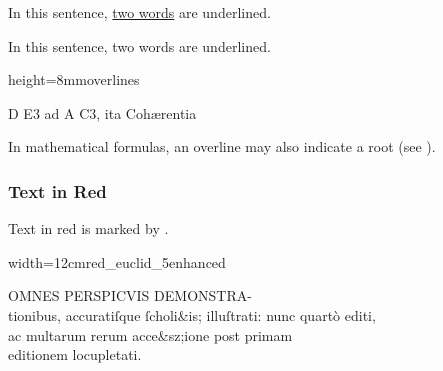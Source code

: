 
\vspace{3mm}
\begin{example}[ 1: \, underlines]

\vspace{-4mm}
In this sentence, \underline{two words} are underlined.

\vspace{-3mm}
\begin{typeLatin}
In this sentence, two words are underlined.
\end{typeLatin}
\end{example}

\begin{sampleImageSmall}[ 2: \, overlines]{height=8mm}{overlines}

\begin{typeLatin}
D E3 ad A C\lwr{}3, ita Cohærentia
\end{typeLatin}
\end{sampleImageSmall}

\begin{crossref}
In mathematical formulas, an overline may also indicate a root (see ).
\end{crossref}


\subsubsection{Text in Red}
\label{section text in red}

\begin{mainruleLessImportant}
Text in red is marked by .
\end{mainruleLessImportant}

\vspace{3mm}
\begin{sampleImageSmall}{width=12cm}{red_euclid_5enhanced}

\begin{typeLatin}
OMNES PERSPICVIS DEMONSTRA-  \\
tionibus, accuratiſque ſcholi&is; illuſtrati: nunc quartò editi,  \\
ac multarum rerum acce&sz;ione post primam  \\
editionem locupletati.
\end{typeLatin}
\end{sampleImageSmall}

